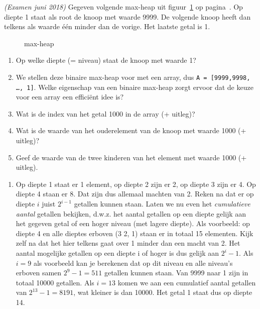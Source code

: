 \begin{oef}
\papier \emph{(Examen juni 2018)} Gegeven volgende max-heap uit figuur~\ref{fig:maxheapa} op pagina~\pageref{fig:maxheapa}. Op diepte 1 staat als root de knoop met waarde 9999. De volgende knoop heeft dan telkens als waarde één minder dan de vorige. Het laatste getal is 1. 
\begin{figure}[htbp]
    \centering
{}
\caption{max-heap}
    \label{fig:maxheapa}
\end{figure}

\begin{enumerate}
\item Op welke diepte (= niveau) staat de knoop met waarde 1?

\item We stellen deze binaire max-heap voor met een array, dus \verb+A = [9999,9998, …, 1]+. Welke eigenschap van een binaire max-heap zorgt ervoor dat de keuze voor een array een efficiënt idee is?

\item Wat is de index van het getal 1000 in de array (+ uitleg)?

\item Wat is de waarde van het ouderelement van de knoop met waarde 1000 (+ uitleg)?

\item Geef de waarde van de twee kinderen van het element met waarde 1000 (+ uitleg).
\end{enumerate}

\begin{opl}
\begin{enumerate}
\item Op diepte 1 staat er 1 element, op diepte 2 zijn er 2, op diepte 3 zijn er 4. Op diepte 4 staan er 8. Dat zijn dus allemaal machten van 2. Reken na dat er op diepte $i$ juist $2^{i-1}$ getallen kunnen staan. Laten we nu even het \emph{cumulatieve aantal} getallen bekijken, d.w.z. het aantal getallen op een diepte gelijk aan het gegeven getal of een hoger niveau (met lagere diepte). Als voorbeeld: op diepte 4 en alle dieptes erboven (3 2, 1) staan er in totaal 15 elementen. Kijk zelf na dat het hier telkens gaat over 1 minder dan een macht van 2. Het aantal mogelijke getallen op een diepte i of hoger is dus gelijk aan $2^i - 1$. Als $i=9$ als voorbeeld kan je berekenen dat op dit niveau en alle niveau's erboven samen $2^9 - 1 = 511$ getallen kunnen staan. Van 9999 naar 1 zijn in totaal 10000 getallen. Als $i=13$ komen we aan een cumulatief aantal getallen van $2^{13}-1=8191$, wat kleiner is dan 10000. Het getal 1 staat dus op diepte 14.


\end{enumerate}
\end{opl}
\end{oef}
